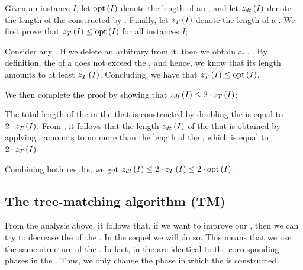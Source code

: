 Given an instance $I$, let $\mbox{opt}\left( I \right)$ denote the length of an , and let $z_{dt}\left( I \right)$ denote the length of the  constructed by . Finally, let $z_T\left( I \right)$ denote the length of a . We first prove that $z_T\left( I \right)\leq\mbox{opt}\left( I \right)$ for all instances $I$;
\begin{subproof}
Consider any . If we delete an arbitrary  from it, then we obtain a... . By definition, the  of a  does not exceed the , and hence, we know that its length amounts to at least $z_T\left( I \right)$. Concluding, we have that $z_T\left( I \right)\leq\mbox{opt}\left( I \right)$.
\end{subproof}
We then complete the proof by showing that $z_{dt}\left( I \right)\leq2\cdot z_T\left( I \right)$:
\begin{subproof}
The total length of the  in the  that is constructed by doubling the  is equal to $2\cdot z_T\left( I \right)$. From , it follows that the length $z_{dt}\left( I \right)$ of the  that is obtained by applying , amounts to no more than the length of the , which is equal to $2\cdot z_T\left( I \right)$.
\end{subproof}
Combining both results, we get $z_{dt}\left( I \right)\leq2\cdot z_T\left( I \right)\leq2\cdot\mbox{opt}\left( I \right)$.

\subsection{The tree-matching algorithm (TM)}

From the analysis above, it follows that, if we want to improve our , then we can try to decrease the  of the . In the sequel we will do so. This means that we use the same structure of the . In fact,  in the  are identical to the corresponding phases in the . Thus, we only change the phase in which the  is constructed.

